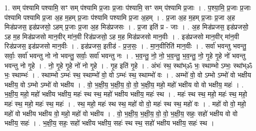 \documentclass[17pt]{extarticle}
\begin{document}
1. सम् प॑श्यामि पश्यामि॒ सꣳ सम् प॑श्यामि प्र॒जाः प्र॒जाः प॑श्यामि॒ सꣳ सम् प॑श्यामि प्र॒जाः । . प॒श्या॒मि॒ प्र॒जाः प्र॒जाः प॑श्यामि पश्यामि प्र॒जा अ॒ह म॒हम् प्र॒जाः प॑श्यामि पश्यामि प्र॒जा अ॒हम् । . प्र॒जा अ॒ह म॒हम् प्र॒जाः प्र॒जा अ॒ह मिड॑प्रजस॒ इड॑प्रजसो॒ ऽहम् प्र॒जाः प्र॒जा अ॒ह मिड॑प्रजसः । . प्र॒जा इति॑ प्र - जाः । . अ॒ह मिड॑प्रजस॒ इड॑प्रजसो॒ ऽह म॒ह मिड॑प्रजसो मान॒वीर् मा॑न॒वी रिड॑प्रजसो॒ ऽह म॒ह मिड॑प्रजसो मान॒वीः । . इड॑प्रजसो मान॒वीर् मा॑न॒वी रिड॑प्रजस॒ इड॑प्रजसो मान॒वीः । . इड॑प्रजस॒ इतीड॑ - प्र॒ज॒सः॒ । . मा॒न॒वीरिति॑ मान॒वीः । . सर्वा॑ भवन्तु भवन्तु॒ सर्वाः॒ सर्वा॑ भवन्तु नो नो भवन्तु॒ सर्वाः॒ सर्वा॑ भवन्तु नः । . भ॒व॒न्तु॒ नो॒ नो॒ भ॒व॒न्तु॒ भ॒व॒न्तु॒ नो॒ गृ॒हे गृ॒हे नो॑ भवन्तु भवन्तु नो गृ॒हे । . नो॒ गृ॒हे गृ॒हे नो॑ नो गृ॒हे । . गृ॒ह इति॑ गृ॒हे । . अंभः॑ स्थ॒ स्थांभ्ॐ भः॒ स्थाम्भो ऽम्भः॒ स्थांभ्ॐ भः॒ स्थाम्भः॑ । . स्थाम्भो ऽम्भः॑ स्थ॒ स्थाम्भो॑ वो॒ वो ऽम्भः॑ स्थ॒ स्थाम्भो॑ वः । . अम्भो॑ वो॒ वो ऽम्भो ऽम्भो॑ वो भक्षीय भक्षीय॒ वो ऽम्भो ऽम्भो॑ वो भक्षीय । . वो॒ भ॒क्षी॒य॒ भ॒क्षी॒य॒ वो॒ वो॒ भ॒क्षी॒य॒ महो॒ महो॑ भक्षीय वो वो भक्षीय॒ महः॑ । . भ॒क्षी॒य॒ महो॒ महो॑ भक्षीय भक्षीय॒ महः॑ स्थ स्थ॒ महो॑ भक्षीय भक्षीय॒ महः॑ स्थ । . महः॑ स्थ स्थ॒ महो॒ महः॑ स्थ॒ महो॒ महः॑ स्थ॒ महो॒ महः॑ स्थ॒ महः॑ । . स्थ॒ महो॒ महः॑ स्थ स्थ॒ महो॑ वो वो॒ महः॑ स्थ स्थ॒ महो॑ वः । . महो॑ वो वो॒ महो॒ महो॑ वो भक्षीय भक्षीय वो॒ महो॒ महो॑ वो भक्षीय । . वो॒ भ॒क्षी॒य॒ भ॒क्षी॒य॒ वो॒ वो॒ भ॒क्षी॒य॒ सहः॒ सहो॑ भक्षीय वो वो भक्षीय॒ सहः॑ । . भ॒क्षी॒य॒ सहः॒ सहो॑ भक्षीय भक्षीय॒ सहः॑ स्थ स्थ॒ सहो॑ भक्षीय भक्षीय॒ सहः॑ स्थ । \newline
\end{document}
